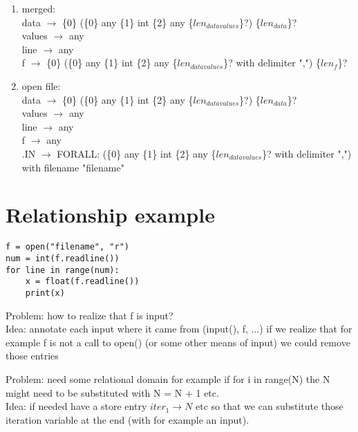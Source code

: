 \documentclass[11pt]{article}
\begin{document}
\begin{enumerate}
  \item merged: \\
  data $\rightarrow$ \{0\} (\{0\} any \{1\} int \{2\} any \{$len_{datavalues}$\}?) \{$len_{data}$\}? \\
  values $\rightarrow$ any \\
  line $\rightarrow$ any \\
  f $\rightarrow$ \{0\} (\{0\} any \{1\} int \{2\} any \{$len_{datavalues}$\}? with delimiter ",") \{$len_{f}$\}? \\
  
  \item open file: \\
  data $\rightarrow$ \{0\} (\{0\} any \{1\} int \{2\} any \{$len_{datavalues}$\}?) \{$len_{data}$\}? \\
  values $\rightarrow$ any \\
  line $\rightarrow$ any \\
  f $\rightarrow$ any \\
  .IN $\rightarrow$ FORALL: (\{0\} any \{1\} int \{2\} any \{$len_{datavalues}$\}? with delimiter ",") with filename "filename" \\
  
\end{enumerate}

\section{Relationship example}

\begin{lstlisting}
f = open("filename", "r")
num = int(f.readline())
for line in range(num):
    x = float(f.readline())
    print(x)
\end{lstlisting}

Problem: how to realize that f is input? \\
Idea: annotate each input where it came from (input(), f, ...) if we realize that for example f is not a call to open() (or some other means of input) we could remove those entries

Problem: need some relational domain for example if for i in range(N) the N might need to be substituted with N = N + 1 etc.\\
Idea: if needed have a store entry $iter_1 \rightarrow N$ etc so that we can substitute those iteration variable at the end (with for example an input).\\
\end{document}
